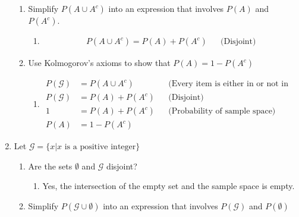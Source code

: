 \documentclass[krantz1,ChapterTOCs]{krantz}
\begin{document}
\begin{enumerate}
\begin{enumerate}
        \item Simplify $P(A \cup A^{c})$ into an expression that involves $P(A)$ and $P(A^{c})$.
            \begin{enumerate}
                \item {\color{red} 
                \begin{align*}
                    P(A \cup A^{c}) = P(A) + P(A^{c}) & & \text{(Disjoint)}
                \end{align*}
                }
            \end{enumerate}
        
        \item Use Kolmogorov's axioms to show that $P(A) = 1 - P(A^{c})$ 
            \begin{enumerate}
                \item {\color{red}   
                \begin{align*}
                    P(\mathcal{G}) &= P(A \cup A^{c}) & & \text{(Every item is either in or not in A)} \\ 
                    P(\mathcal{G}) &= P(A) + P(A^{c}) & & \text{(Disjoint)} \\
                    1 &= P(A) + P(A^{c}) & & \text{(Probability of sample space)} \\ 
                   P(A)  &= 1 -  P(A^{c})
                \end{align*}
                }
            \end{enumerate}
        
    \end{enumerate}
    
    \item Let $\mathcal{G} = \{x | x\text{ is a positive integer}\}$
    \begin{enumerate}
        \item Are the sets $\emptyset$ and $\mathcal{G}$ disjoint?
            \begin{enumerate}
                \item {\color{red} Yes, the intersection of the empty set and the sample space is empty. }
            \end{enumerate}
        
        \item Simplify $P(\mathcal{G} \cup \emptyset)$ into an expression that involves $P(\mathcal{G})$ and $P(\emptyset)$
        

\end{enumerate}
\end{enumerate}
\end{document}
